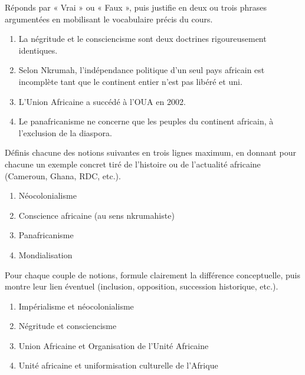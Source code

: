 \documentclass[11pt]{article}
\begin{document}
\begin{exercice}
Réponds par « Vrai » ou « Faux », puis justifie en deux ou trois phrases argumentées en mobilisant le vocabulaire précis du cours.

\begin{enumerate}
\item La négritude et le consciencisme sont deux doctrines rigoureusement identiques.
\item Selon Nkrumah, l'indépendance politique d'un seul pays africain est incomplète tant que le continent entier n'est pas libéré et uni.
\item L'Union Africaine a succédé à l'OUA en 2002.
\item Le panafricanisme ne concerne que les peuples du continent africain, à l'exclusion de la diaspora.
\end{enumerate}
\end{exercice}

\begin{exercice}[Définitions]
Définis chacune des notions suivantes en trois lignes maximum, en donnant pour chacune un exemple concret tiré de l'histoire ou de l'actualité africaine (Cameroun, Ghana, RDC, etc.).

\begin{enumerate}
\item Néocolonialisme
\item Conscience africaine (au sens nkrumahiste)
\item Panafricanisme
\item Mondialisation
\end{enumerate}
\end{exercice}

\begin{exercice}
Pour chaque couple de notions, formule clairement la différence conceptuelle, puis montre leur lien éventuel (inclusion, opposition, succession historique, etc.).

\begin{enumerate}
\item Impérialisme et néocolonialisme
\item Négritude et consciencisme
\item Union Africaine et Organisation de l'Unité Africaine
\item Unité africaine et uniformisation culturelle de l'Afrique
\end{enumerate}
\end{exercice}
\end{document}
